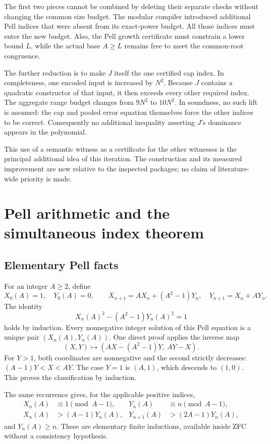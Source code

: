 \documentclass[11pt,a4paper]{article}
\theoremstyle{remark}
\begin{document}
The first two pieces cannot be combined by deleting their separate checks
without changing the common size budget. The modular compiler introduced
additional Pell indices that were absent from its exact-power budget. All
those indices must enter the new budget. Also, the Pell growth certificate
must constrain a lower bound \(L\), while the actual base \(A\ge L\) remains
free to meet the common-root congruence.

The further reduction is to make \(J\) itself the one certified cap index.
In completeness, one encoded input is increased by \(N^2\). Because \(J\)
contains a quadratic constructor of that input, it then exceeds every other
required index. The aggregate range budget changes from \(9N^2\) to
\(10N^2\). In soundness, no such lift is assumed: the cap and pooled error
equation themselves force the other indices to be correct. Consequently no
additional inequality asserting \(J\)'s dominance appears in the polynomial.

This use of a semantic witness as a certificate for the other witnesses is
the principal additional idea of this iteration. The construction and its
measured improvement are new relative to the inspected packages; no claim
of literature-wide priority is made.

\section{Pell arithmetic and the simultaneous index theorem}

\subsection{Elementary Pell facts}

For an integer \(A\ge2\), define
\[
 X_0(A)=1,\quad Y_0(A)=0,\qquad
 X_{n+1}=AX_n+(A^2-1)Y_n,\quad Y_{n+1}=X_n+AY_n.
\]
The identity
\[
 X_n(A)^2-(A^2-1)Y_n(A)^2=1
\]
holds by induction. Every nonnegative integer solution of this Pell equation
is a unique pair \((X_n(A),Y_n(A))\). One direct proof applies the inverse
map
\[
 (X,Y)\longmapsto (AX-(A^2-1)Y,\ AY-X).
\]
For \(Y>1\), both coordinates are nonnegative and the second strictly
decreases: \((A-1)Y<X<AY\). The case \(Y=1\) is \((A,1)\), which
descends to \((1,0)\). This proves the classification by induction.

The same recurrence gives, for the applicable positive indices,
\begin{align}
 X_n(A)&\equiv1\pmod{A-1}, &Y_n(A)&\equiv n\pmod{A-1},\label{eq:pellresidue}\\
 X_n(A)&>(A-1)Y_n(A), &Y_{n+1}(A)&>(2A-1)Y_n(A),\label{eq:pellgrowth}
\end{align}
and \(Y_n(A)\ge n\). These are elementary finite inductions, available
inside ZFC without a consistency hypothesis.
\end{document}
